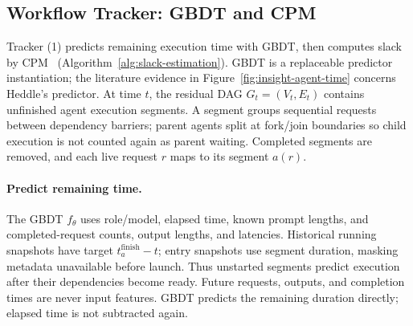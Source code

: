 \subsection{Workflow Tracker: GBDT and CPM}
\label{sec:workflow-protection}

Tracker (1) predicts remaining execution time with GBDT, then computes
slack by CPM~\cite{kelley1959cpm} (Algorithm~\ref{alg:slack-estimation}).
GBDT is a replaceable predictor instantiation; the literature evidence
in Figure~\ref{fig:insight-agent-time} concerns Heddle's predictor.
At time $t$, the residual DAG $G_t=(V_t,E_t)$ contains unfinished agent
execution segments. A segment groups sequential requests between
dependency barriers; parent agents split at fork/join boundaries so
child execution is not counted again as parent waiting. Completed
segments are removed, and each live request $r$ maps to its segment $a(r)$.

\paragraph{Predict remaining time.}
The GBDT $f_\theta$ uses role/model, elapsed time, known prompt lengths,
and completed-request counts, output lengths, and latencies.
Historical running snapshots have target $t_a^{\mathrm{finish}}-t$;
entry snapshots use segment duration, masking metadata unavailable
before launch. Thus unstarted segments predict execution after their
dependencies become ready. Future requests, outputs, and completion
times are never input features. GBDT predicts the remaining duration
directly; elapsed time is not subtracted again.

